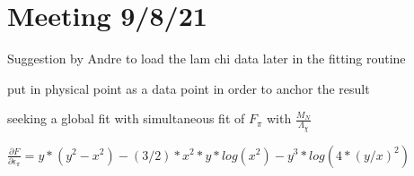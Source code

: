 \documentclass[12pt,tightenlines, raggedbottom, prd, notitlepage]{revtex4-1}
\begin{document}
\section{Meeting 9/8/21}
Suggestion by Andre to load the lam chi data later in the fitting routine 

put in physical point as a data point in order to anchor the result 

seeking a global fit with simultaneous fit of $F_\pi$ with $\frac{M_N}{\Lambda_\chi}$ 

\appendix
$ \frac{\partial F}{\partial \epsilon_\pi} = y *(y^2 - x^2) - (3/2) *x^2 *y *log(x^2)- y^3 *log(4 *(y/x)^2)$
\end{document}
